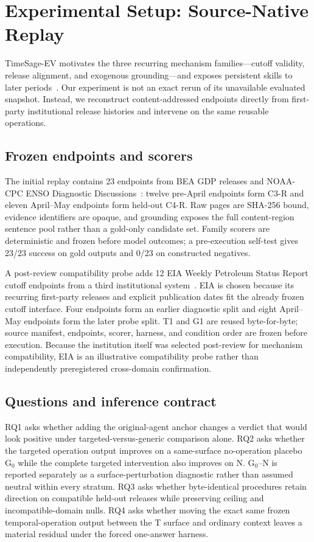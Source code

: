 \section{Experimental Setup: Source-Native Replay}
\label{sec:evidence}
TimeSage-EV motivates the three recurring mechanism families---cutoff validity, release alignment, and exogenous grounding---and exposes persistent skills to later periods~\citep{yao2026timesage}. Our experiment is not an exact rerun of its unavailable evaluated snapshot. Instead, we reconstruct content-addressed endpoints directly from first-party institutional release histories and intervene on the same reusable operations.

\subsection{Frozen endpoints and scorers}
The initial replay contains 23 endpoints from BEA GDP releases and NOAA-CPC ENSO Diagnostic Discussions~\citep{bea2026archive,noaa2026enso}: twelve pre-April endpoints form C3-R and eleven April--May endpoints form held-out C4-R. Raw pages are SHA-256 bound, evidence identifiers are opaque, and grounding exposes the full content-region sentence pool rather than a gold-only candidate set. Family scorers are deterministic and frozen before model outcomes; a pre-execution self-test gives 23/23 success on gold outputs and 0/23 on constructed negatives.

A post-review compatibility probe adds 12 EIA Weekly Petroleum Status Report cutoff endpoints from a third institutional system~\citep{eia2026wpsrarchive}. EIA is chosen because its recurring first-party releases and explicit publication dates fit the already frozen cutoff interface. Four endpoints form an earlier diagnostic split and eight April--May endpoints form the later probe split. T1 and G1 are reused byte-for-byte; source manifest, endpoints, scorer, harness, and condition order are frozen before execution. Because the institution itself was selected post-review for mechanism compatibility, EIA is an illustrative compatibility probe rather than independently preregistered cross-domain confirmation.

\subsection{Questions and inference contract}
RQ1 asks whether adding the original-agent anchor changes a verdict that would look positive under targeted-versus-generic comparison alone. RQ2 asks whether the targeted operation output improves on a same-surface no-operation placebo G$_0$ while the complete targeted intervention also improves on N. G$_0$--N is reported separately as a surface-perturbation diagnostic rather than assumed neutral within every stratum. RQ3 asks whether byte-identical procedures retain direction on compatible held-out releases while preserving ceiling and incompatible-domain nulls. RQ4 asks whether moving the exact same frozen temporal-operation output between the T surface and ordinary context leaves a material residual under the forced one-answer harness.

